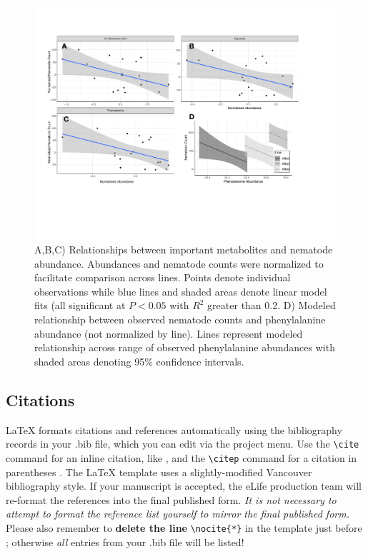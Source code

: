 \documentclass[9pt,lineno]{elife}
\begin{document}
\begin{figure}
\includegraphics[width = 0.95\linewidth]{figures/publication_figures/figure-5.pdf}
\caption{A,B,C) Relationships between important metabolites and nematode abundance.  Abundances and nematode counts were normalized to facilitate comparison across lines.  Points denote individual observations while blue lines and shaded areas denote linear model fits (all significant at $P < 0.05$ with $R^2$ greater than 0.2.  D) Modeled relationship between observed nematode counts and phenylalanine abundance (not normalized by line).  Lines represent modeled relationship across range of observed phenylalanine abundances with shaded areas denoting 95\% confidence intervals. }
\label{fig:figure4}
\end{figure}







\subsection{Citations}

LaTeX formats citations and references automatically using the bibliography records in your .bib file, which you can edit via the project menu. Use the \verb|\cite| command for an inline citation, like \cite{Aivazian917}, and the \verb|\citep| command for a citation in parentheses \citep{Aivazian917}. The LaTeX template uses a slightly-modified Vancouver bibliography style. If your manuscript is accepted, the eLife production team will re-format the references into the final published form. \emph{It is not necessary to attempt to format the reference list yourself to mirror the final published form.} Please also remember to \textbf{delete the line} \verb|\nocite{*}| in the template just before \verb||; otherwise \emph{all} entries from your .bib file will be listed! 
\end{document}
